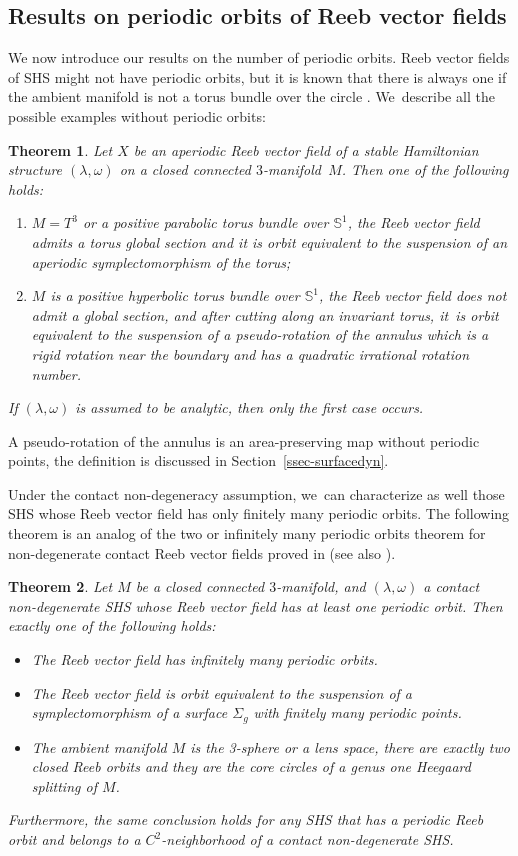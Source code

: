 \documentclass[JEP,XML,SOM,Unicode,NoEqCountersInSection,NoFloatCountersInSection,published]{cedram}
\newcommand{\threemanifold}{$3$\nobreakdash-mani\-fold\xspace}
\newtheorem{thm}{Theorem}
\theoremstyle{definition}
\newcommand{\mS}{\mathbb{S}}
\begin{document}
\subsection{Results on periodic orbits of Reeb vector fields}
We now introduce our results on the number of periodic orbits. Reeb vector fields of SHS might not have periodic orbits, but it is known that there is always one if the ambient manifold is not a torus bundle over the circle \cite{HT,Re}. We~describe all the possible examples without periodic orbits:

\begin{thm}\label{thm:main1}
Let $X$ be an aperiodic Reeb vector field of a stable Hamiltonian structure $(\lambda,\omega)$ on a closed connected \threemanifold~$M$. Then one of the following holds:
\begin{enumerate}
\item $M=T^3$ or a positive parabolic torus bundle over $\mS^1$, the Reeb vector field admits a torus global section and it is orbit equivalent to the suspension of an aperiodic symplectomorphism of the torus;
\item $M$ is a positive hyperbolic torus bundle over $\mS^1$, the Reeb vector field does not admit a global section, and after cutting along an invariant torus, it~is orbit equivalent to the suspension of a pseudo-rotation of the annulus which is a rigid rotation near the boundary and has a quadratic irrational rotation number.
\end{enumerate}
If $(\lambda,\omega)$ is assumed to be analytic, then only the first case occurs.
\end{thm}

A pseudo-rotation of the annulus is an area-preserving map without periodic points, the definition is discussed in Section~\ref{ssec-surfacedyn}.

Under the contact non-degeneracy assumption, we~can characterize as well those SHS whose Reeb vector field has only finitely many periodic orbits. The following theorem is an analog of the two or infinitely many periodic orbits theorem for non-degenerate contact Reeb vector fields proved in \cite{CDR} (see also \cite{HWZ, CgHP}).

\begin{thm}\label{thm:main2}
Let $M$ be a closed connected \threemanifold, and $(\lambda,\omega)$ a contact non-degenerate SHS whose Reeb vector field has at least one periodic orbit. Then exactly one of the following holds:
\begin{itemize}
\item
The Reeb vector field has infinitely many periodic orbits.
\item
The Reeb vector field is orbit equivalent to the suspension of a symplectomorphism of a surface $\Sigma_g$ with finitely many periodic points.
\item
The ambient manifold $M$ is the 3-sphere or a lens space, there are exactly two closed Reeb orbits and they are the core circles of a genus one Heegaard splitting of $M$.
\end{itemize}
Furthermore, the same conclusion holds for any SHS that has a periodic Reeb orbit and belongs to a $C^2$-neighborhood of a contact non-degenerate SHS.
\end{thm}
\end{document}
